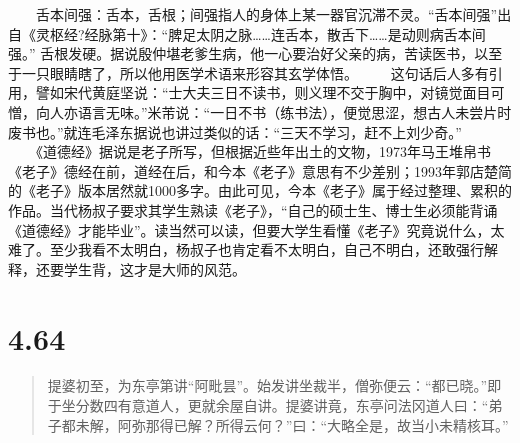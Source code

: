 \documentclass[]{book}
\begin{document}
　　舌本间强：舌本，舌根；间强指人的身体上某一器官沉滞不灵。``舌本间强''出自《灵枢经?经脉第十》：``脾足太阴之脉\ldots{}\ldots{}连舌本，散舌下\ldots{}\ldots{}是动则病舌本间强。''
舌根发硬。据说殷仲堪老爹生病，他一心要治好父亲的病，苦读医书，以至于一只眼睛瞎了，所以他用医学术语来形容其玄学体悟。
　　这句话后人多有引用，譬如宋代黄庭坚说：``士大夫三日不读书，则义理不交于胸中，对镜觉面目可憎，向人亦语言无味。''米芾说：``一日不书（练书法），便觉思涩，想古人未尝片时废书也。''就连毛泽东据说也讲过类似的话：``三天不学习，赶不上刘少奇。''
　　《道德经》据说是老子所写，但根据近些年出土的文物，1973年马王堆帛书《老子》德经在前，道经在后，和今本《老子》意思有不少差别；1993年郭店楚简的《老子》版本居然就1000多字。由此可见，今本《老子》属于经过整理、累积的作品。当代杨叔子要求其学生熟读《老子》，``自己的硕士生、博士生必须能背诵《道德经》才能毕业''。读当然可以读，但要大学生看懂《老子》究竟说什么，太难了。至少我看不太明白，杨叔子也肯定看不太明白，自己不明白，还敢强行解释，还要学生背，这才是大师的风范。

\section{4.64}\label{section-241}

\begin{quote}
提婆初至，为东亭第讲``阿毗昙''。始发讲坐裁半，僧弥便云：``都已晓。''即于坐分数四有意道人，更就余屋自讲。提婆讲竟，东亭问法冈道人曰：``弟子都未解，阿弥那得已解？所得云何？''曰：``大略全是，故当小未精核耳。''
\end{quote}
\end{document}
